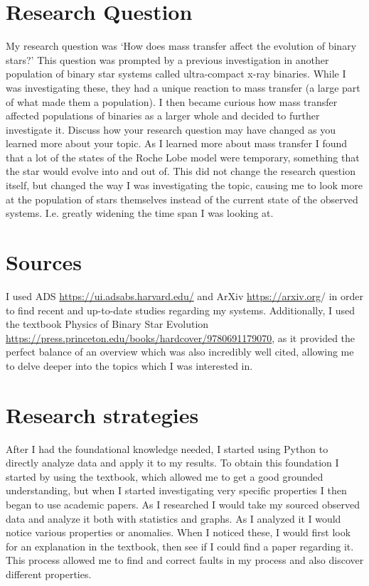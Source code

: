 \documentclass[12pt, a4paper]{article}
\begin{document}
\section{Research Question}
    My research question was `How does mass transfer affect the evolution of binary stars?' This question was prompted by a previous investigation in another population of binary star systems called ultra-compact x-ray binaries. While I was investigating these, they had a unique reaction to mass transfer (a large part of what made them a population). I then became curious how mass transfer affected populations of binaries as a larger whole and decided to further investigate it.
    Discuss how your research question may have changed as you learned more about your topic.
    As I learned more about mass transfer I found that a lot of the states of the Roche Lobe model were temporary, something that the star would evolve into and out of. This did not change the research question itself, but changed the way I was investigating the topic, causing me to look more at the population of stars themselves instead of the current state of the observed systems. I.e. greatly widening the time span I was looking at.
\section{Sources}
    I used ADS \url{https://ui.adsabs.harvard.edu/} and ArXiv \url{https://arxiv.org}/ in order to find recent and up-to-date studies regarding my systems. Additionally, I used the textbook Physics of Binary Star Evolution \url{https://press.princeton.edu/books/hardcover/9780691179070}, as it provided the perfect balance of an overview which was also incredibly well cited, allowing me to delve deeper into the topics which I was interested in.
\section{Research strategies}
   After I had the foundational knowledge needed, I started using Python to directly analyze data and apply it to my results. To obtain this foundation I started by using the textbook, which allowed me to get a good grounded understanding, but when I started investigating very specific properties I then began to use academic papers. As I researched I would take my sourced observed data and analyze it both with statistics and graphs. As I analyzed it I would notice various properties or anomalies. When I noticed these, I would first look for an explanation in the textbook, then see if I could find a paper regarding it. This process allowed me to find and correct faults in my process and also discover different properties.   
\end{document}
